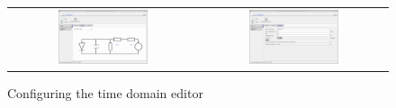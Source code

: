\begin{figure}[H]
\centering
\begin{tabular}{ c c }

\includegraphics[width=0.5\textwidth,height=0.4\textwidth]{./images/time_domain_editor1.png}

&
\includegraphics[width=0.5\textwidth,height=0.4\textwidth]{./images/time_domain_editor4.png}

\\

\end{tabular}
\caption{Configuring the time domain editor}
\label{fig:timedomaineditor2}
\end{figure}
